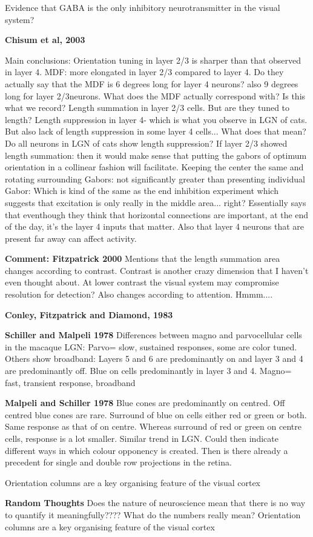 	Evidence that GABA is the only inhibitory neurotransmitter in the visual system?
	
	\textbf{Chisum et al, 2003}
	
	Main conclusions: Orientation tuning in layer 2/3 is sharper than that observed in layer 4. MDF: more elongated in layer 2/3 compared to layer 4. Do they actually say that the MDF is 6 degrees long for layer 4 neurons? also 9 degrees long for layer 2/3neurons. What does the MDF actually correspond with? Is this what we record?
	Length summation in layer 2/3 cells. But are they tuned to length?
	Length suppression in layer  4- which is what you observe in LGN of cats. But also lack of length suppression in some layer 4 cells... What does that mean? Do all neurons in LGN of cats show length suppression?
	If layer 2/3 showed length summation: then it would make sense that putting the gabors of optimum orientation in a collinear fashion will facilitate.
	Keeping the center the same and rotating surrounding Gabors: not significantly greater than presenting individual Gabor: Which is kind of the same as the end inhibition experiment which suggests that excitation is only really in the middle area... right?
	Essentially says that eventhough they think that horizontal connections are important, at the end of the day, it's the layer 4 inputs that matter. Also that layer 4 neurons that are present far away can affect activity.
	
	\textbf{Comment: Fitzpatrick 2000}
	Mentions that the length summation area changes according to contrast.
		Contrast is another crazy dimension that I haven't even thought about.
		At lower contrast the visual system may compromise resolution for detection?
		Also changes according to attention. Hmmm....
		
	\textbf{Conley, Fitzpatrick and Diamond, 1983}
	 

	 \textbf{Schiller and Malpeli 1978}
	 Differences between magno and parvocellular cells in the macaque LGN: 
	 Parvo= slow, sustained responses, some are color tuned. Others show broadband: Layers 5 and 6 are predominantly on and layer 3 and 4 are predominantly off. Blue on cells predominantly in layer 3 and 4.
	 Magno= fast, transient response, broadband
	
	 \textbf{Malpeli and Schiller 1978}
	 Blue cones are predominantly on centred. Off centred blue cones are rare. Surround of blue on cells either red or green or both. Same response as that of on centre. Whereas surround of red or green on
	centre cells, response is a lot smaller. Similar trend in LGN.
	Could then indicate different ways in which colour opponency is created. Then is there already a precedent for single and double row projections in the retina.
	
	Orientation columns are a key organising feature of the visual cortex
	
	
	 \textbf{Random Thoughts}
	 Does the nature of neuroscience mean that there is no way to quantify it meaningfully???? What do the numbers really mean?
	 	Orientation columns are a key organising feature of the visual cortex